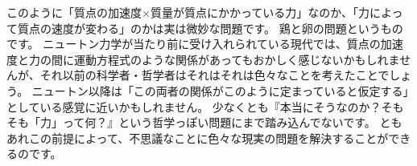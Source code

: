 このように「質点の加速度×質量が質点にかかっている力」なのか、「力によって質点の速度が変わる」のかは実は微妙な問題です。
鶏と卵の問題というものです。
ニュートン力学が当たり前に受け入れられている現代では、質点の加速度と力の間に運動方程式のような関係があってもおかしく感じないかもしれませんが、それ以前の科学者・哲学者はそれはそれは色々なことを考えたことでしょう。
ニュートン以降は「この両者の関係がこのように定まっていると仮定する」としている感覚に近いかもしれません。
少なくとも『本当にそうなのか？そもそも「力」って何？』という哲学っぽい問題にまで踏み込んでないです。
ともあれこの前提によって、不思議なことに色々な現実の問題を解決することができるのです。
